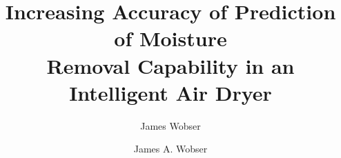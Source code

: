 \documentclass[me,thesis]{kuthesis}
\title{%
  Increasing Accuracy of Prediction of Moisture\\
  Removal Capability in an Intelligent Air Dryer%
}
\author{James Wobser}{Wobser, James}
\author{James A. Wobser}{Wobser, James A.}
\begin{document}
\volume









\appendices











\end{document}
